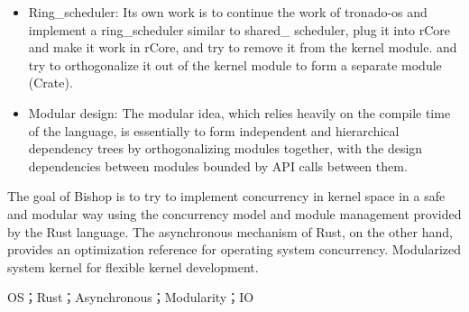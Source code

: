 \begin{itemize}
\item Ring\_scheduler: Its own work is to continue the work of tronado-os and implement a ring\_scheduler similar to shared\_
scheduler, plug it into rCore and make it work in rCore, and try to remove it from the kernel module.
and try to orthogonalize it out of the kernel module to form a separate module (Crate).

\item Modular design: The modular idea, which relies heavily on the compile time of the language, is essentially to form independent and hierarchical dependency trees by orthogonalizing modules together, with the design dependencies between modules bounded by API calls between them.
\end{itemize}


The goal of Bishop is to try to implement concurrency in kernel space in a safe and modular way using the concurrency model and module management provided by the Rust language. The asynchronous mechanism of Rust, on the other hand, provides an optimization reference for operating system concurrency. Modularized system kernel for flexible kernel development.

\keywordsen\quad OS；Rust；Asynchronous；Modularity；IO